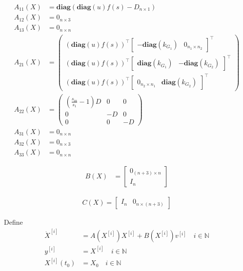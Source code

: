 \documentclass[3p,times]{article}
\newcommand{\N}{\mathbb{N}}
\newcommand{\diag}{\textbf{diag}}
\begin{document}
\begin{align} 
A_{11}(X) &= \diag(\diag(u)f(s)- D_{n\times 1} )\\
A_{12}(X) &= 0_{n\times 3} \\
A_{13}(X) &= 0_{n\times n} \\
A_{21}(X) &= \begin{pmatrix} (\diag(u)f(s))^\top \begin{bmatrix} -\diag(k_{G_1}) & 0_{n_1 \times n_2} \end{bmatrix}^\top \\ (\diag(u)f(s))^\top \begin{bmatrix} \diag(k_{G_1}) & -\diag(k_{G_2}) \end{bmatrix}^\top   \\ 
(\diag(u)f(s))^\top \begin{bmatrix} 0_{n_2 \times n_1} & \diag(k_{G_2}) \end{bmatrix}^\top  \end{pmatrix} \\
 A_{22}(X) &=  \begin{pmatrix} \left(\frac{s_{in}}{s_1}-1\right)D & 0 & 0 \\ 
0 &-D & 0 \\ 
0 & 0 &-D \end{pmatrix} \\
A_{31}(X) &=   0_{n \times n} \\
A_{32}(X) &= 0_{n\times 3}\\
A_{33} (X) &= 0_{n\times n}
\end{align}

\begin{align} 
B(X) & = \begin{bmatrix} 
0_{(n+3)\times n} \\
I_n
\end{bmatrix}  
\end{align}

\begin{align}
C(X) = \begin{bmatrix} 
I_n & 0_{n \times (n+3)}
\end{bmatrix}
\end{align} 

Define 
\begin{align}
\dot{X}^{[i]} &= A(X^{[i]})X^{[i]} + B(X^{[i]})v^{[i]} \quad i\in \N \\
y^{[i]} &= X^{[i]} \quad i\in \N \\
X^{[i]}(t_0) &= X_0 \quad i\in \N
\end{align} 
\end{document}
